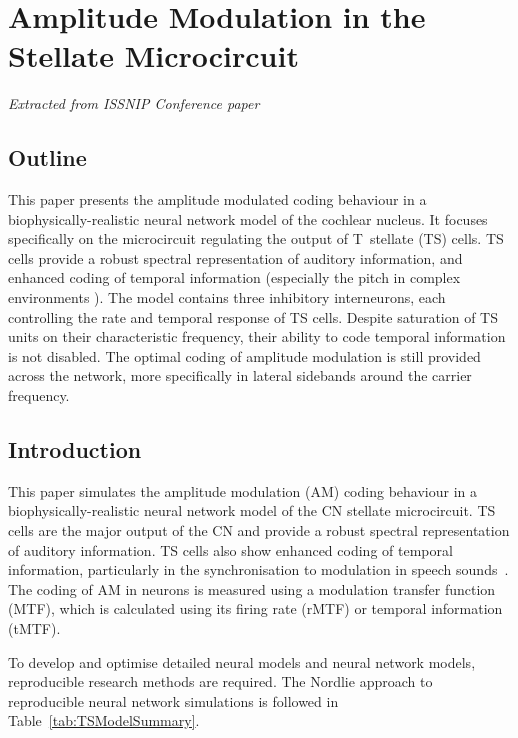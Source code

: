 
\section{Amplitude Modulation in the Stellate Microcircuit}

\textit{Extracted from ISSNIP Conference paper}

\subsection*{Outline}
This paper presents the amplitude modulated coding behaviour in a
biophysically-realistic neural network model of the cochlear nucleus. It focuses
specifically on the microcircuit regulating the output of T~stellate (TS) cells.
TS cells provide a robust spectral representation of auditory information, and
enhanced coding of temporal information (especially the pitch in complex
environments \cite{KeilsonRichardsEtAl:1997}).  The model contains three
inhibitory interneurons, each controlling the rate and temporal response of TS
cells.  Despite saturation of TS units on their characteristic frequency, their
ability to code temporal information is not disabled.  The optimal coding of
amplitude modulation is still provided across the network, more specifically in
lateral sidebands around the carrier frequency.



\subsection{Introduction}
%

This paper simulates the amplitude modulation (AM) coding behaviour
in a biophysically-realistic neural network model of the CN
stellate microcircuit. TS cells are the major output of the CN and
provide a robust spectral representation of auditory information.
TS cells also show enhanced coding of temporal information,
particularly in the synchronisation to modulation in speech
sounds~\cite{BlackburnSachs:1990,KeilsonRichardsEtAl:1997}.  The
coding of AM in neurons is measured using a modulation transfer
function (MTF), which is calculated using its firing rate (rMTF) or
temporal information (tMTF).

To develop and optimise detailed neural models and neural network
models, reproducible research methods are required. The Nordlie
approach to reproducible neural network simulations
\cite{NordlieGewaltigEtAl:2009} is followed in
Table~\ref{tab:TSModelSummary}. 



